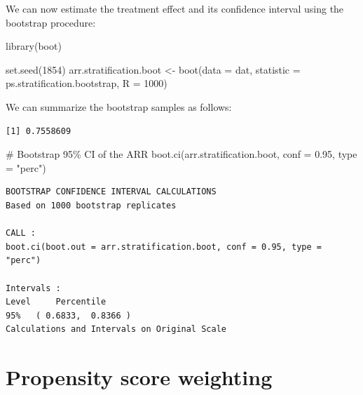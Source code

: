 \documentclass[
  letterpaper,
  DIV=11,
  numbers=noendperiod]{scrreprt}
\newenvironment{Shaded}{\begin{snugshade}}{\end{snugshade}}
\newcommand{\AttributeTok}[1]{\textcolor[rgb]{0.40,0.45,0.13}{#1}}
\newcommand{\CommentTok}[1]{\textcolor[rgb]{0.37,0.37,0.37}{#1}}
\newcommand{\DecValTok}[1]{\textcolor[rgb]{0.68,0.00,0.00}{#1}}
\newcommand{\FloatTok}[1]{\textcolor[rgb]{0.68,0.00,0.00}{#1}}
\newcommand{\FunctionTok}[1]{\textcolor[rgb]{0.28,0.35,0.67}{#1}}
\newcommand{\NormalTok}[1]{\textcolor[rgb]{0.00,0.23,0.31}{#1}}
\newcommand{\OtherTok}[1]{\textcolor[rgb]{0.00,0.23,0.31}{#1}}
\newcommand{\SpecialCharTok}[1]{\textcolor[rgb]{0.37,0.37,0.37}{#1}}
\newcommand{\StringTok}[1]{\textcolor[rgb]{0.13,0.47,0.30}{#1}}
\begin{document}
We can now estimate the treatment effect and its confidence interval
using the bootstrap procedure:

\begin{Shaded}
\begin{Highlighting}[]
\FunctionTok{library}\NormalTok{(boot)}

\FunctionTok{set.seed}\NormalTok{(}\DecValTok{1854}\NormalTok{)}
\NormalTok{arr.stratification.boot }\OtherTok{\textless{}{-}} \FunctionTok{boot}\NormalTok{(}\AttributeTok{data =}\NormalTok{ dat, }
                                \AttributeTok{statistic =}\NormalTok{ ps.stratification.bootstrap, }
                                \AttributeTok{R =} \DecValTok{1000}\NormalTok{)}
\end{Highlighting}
\end{Shaded}

We can summarize the bootstrap samples as follows:

\begin{Shaded}
\end{Shaded}

\begin{verbatim}
[1] 0.7558609
\end{verbatim}

\begin{Shaded}
\begin{Highlighting}[]
\CommentTok{\# Bootstrap 95\% CI of the ARR}
\FunctionTok{boot.ci}\NormalTok{(arr.stratification.boot, }\AttributeTok{conf =} \FloatTok{0.95}\NormalTok{, }\AttributeTok{type =} \StringTok{"perc"}\NormalTok{)}
\end{Highlighting}
\end{Shaded}

\begin{verbatim}
BOOTSTRAP CONFIDENCE INTERVAL CALCULATIONS
Based on 1000 bootstrap replicates

CALL : 
boot.ci(boot.out = arr.stratification.boot, conf = 0.95, type = "perc")

Intervals : 
Level     Percentile     
95%   ( 0.6833,  0.8366 )  
Calculations and Intervals on Original Scale
\end{verbatim}

\hypertarget{propensity-score-weighting}{%
\section{Propensity score weighting}\label{propensity-score-weighting}}
\end{document}

